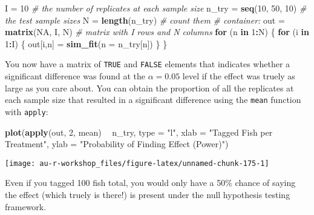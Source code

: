 \documentclass[]{book}
\newenvironment{Shaded}{\begin{snugshade}}{\end{snugshade}}
\newcommand{\KeywordTok}[1]{\textcolor[rgb]{0.13,0.29,0.53}{\textbf{#1}}}
\newcommand{\DataTypeTok}[1]{\textcolor[rgb]{0.13,0.29,0.53}{#1}}
\newcommand{\DecValTok}[1]{\textcolor[rgb]{0.00,0.00,0.81}{#1}}
\newcommand{\StringTok}[1]{\textcolor[rgb]{0.31,0.60,0.02}{#1}}
\newcommand{\CommentTok}[1]{\textcolor[rgb]{0.56,0.35,0.01}{\textit{#1}}}
\newcommand{\OtherTok}[1]{\textcolor[rgb]{0.56,0.35,0.01}{#1}}
\newcommand{\ControlFlowTok}[1]{\textcolor[rgb]{0.13,0.29,0.53}{\textbf{#1}}}
\newcommand{\OperatorTok}[1]{\textcolor[rgb]{0.81,0.36,0.00}{\textbf{#1}}}
\newcommand{\NormalTok}[1]{#1}
\theoremstyle{definition}
\theoremstyle{definition}
\theoremstyle{definition}
\theoremstyle{remark}
\begin{document}
\begin{Shaded}
\begin{Highlighting}[]
\NormalTok{I =}\StringTok{ }\DecValTok{10}  \CommentTok{# the number of replicates at each sample size}
\NormalTok{n_try =}\StringTok{ }\KeywordTok{seq}\NormalTok{(}\DecValTok{10}\NormalTok{, }\DecValTok{50}\NormalTok{, }\DecValTok{10}\NormalTok{)  }\CommentTok{# the test sample sizes}
\NormalTok{N =}\StringTok{ }\KeywordTok{length}\NormalTok{(n_try)        }\CommentTok{# count them}
\CommentTok{# container: }
\NormalTok{out =}\StringTok{ }\KeywordTok{matrix}\NormalTok{(}\OtherTok{NA}\NormalTok{, I, N) }\CommentTok{# matrix with I rows and N columns}
\ControlFlowTok{for}\NormalTok{ (n }\ControlFlowTok{in} \DecValTok{1}\OperatorTok{:}\NormalTok{N) \{}
  \ControlFlowTok{for}\NormalTok{ (i }\ControlFlowTok{in} \DecValTok{1}\OperatorTok{:}\NormalTok{I) \{}
\NormalTok{    out[i,n] =}\StringTok{ }\KeywordTok{sim_fit}\NormalTok{(}\DataTypeTok{n =}\NormalTok{ n_try[n])}
\NormalTok{  \}}
\NormalTok{\}}
\end{Highlighting}
\end{Shaded}

You now have a matrix of \texttt{TRUE} and \texttt{FALSE} elements that
indicates whether a significant difference was found at the
\(\alpha = 0.05\) level if the effect was truely as large as you care
about. You can obtain the proportion of all the replicates at each
sample size that resulted in a significant difference using the
\texttt{mean} function with \texttt{apply}:

\begin{Shaded}
\begin{Highlighting}[]
\KeywordTok{plot}\NormalTok{(}\KeywordTok{apply}\NormalTok{(out, }\DecValTok{2}\NormalTok{, mean) }\OperatorTok{~}\StringTok{ }\NormalTok{n_try, }\DataTypeTok{type =} \StringTok{"l"}\NormalTok{,}
     \DataTypeTok{xlab =} \StringTok{"Tagged Fish per Treatment"}\NormalTok{,}
     \DataTypeTok{ylab =} \StringTok{"Probability of Finding Effect (Power)"}\NormalTok{)}
\end{Highlighting}
\end{Shaded}

\begin{center}\texttt{[image: au-r-workshop\_files/figure-latex/unnamed-chunk-175-1]} \end{center}

Even if you tagged 100 fish total, you would only have a 50\% chance of
saying the effect (which truely is there!) is present under the null
hypothesis testing framework.
\end{document}

